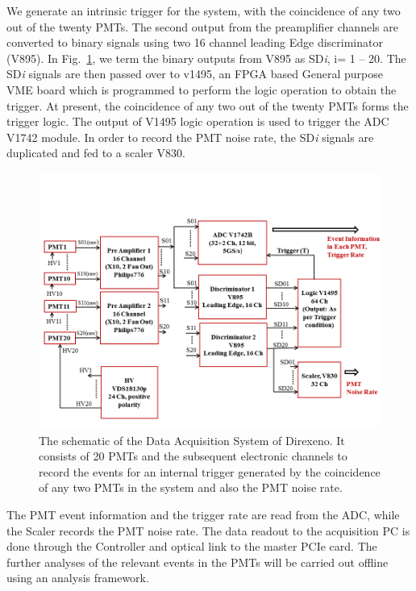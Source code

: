 We generate an intrinsic trigger for the system, 
with the coincidence of any two out of the twenty PMTs. The second output from the 
preamplifier channels are converted to binary signals using two 16 channel leading 
Edge discriminator (V895). In Fig.~\ref{Fig:DAQscheme}, we term the binary 
outputs from V895 as SD{\it i}, i= 1 -- 20. The SD{\it i} signals are then passed over to 
v1495, an FPGA based General purpose VME board which is programmed to perform the 
logic operation to obtain the trigger. At present, the coincidence of any two out 
of the twenty PMTs forms the trigger logic. The output of V1495 logic operation is 
used to trigger the ADC V1742 module. In order to record the PMT noise rate, the 
SD{\it i} signals are duplicated and fed to a scaler V830.


\begin{figure}
   \centering
   \includegraphics[width=\textwidth]{DAQscheme.png}
   \caption{The schematic of the Data Acquisition System of Direxeno. It 
        consists of 20 PMTs and the subsequent electronic channels to record 
        the events for an internal trigger generated by the coincidence of any 
        two PMTs in the system and also the PMT noise rate.}
   \label{Fig:DAQscheme}
\end{figure}

The PMT event information and the trigger rate are read from the ADC, while the Scaler 
records the PMT noise rate. The data readout to the acquisition PC is done through the 
Controller and optical link to the master PCIe card. The further analyses of the 
relevant events in the PMTs will be carried out offline using an analysis 
framework.





\clearpage %
